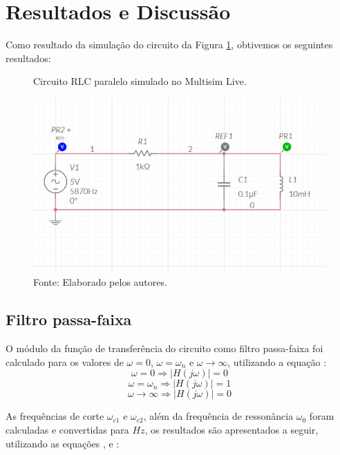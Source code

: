 \newpage
\section{Resultados e Discussão}

Como resultado da simulação do circuito da Figura \ref{circuitoSimulado}, obtivemos os seguintes resultados:

\begin{figure}[H]
	\centering
	\caption{Circuito RLC paralelo simulado no Multisim Live.}
	\includegraphics[width=15cm]{images/circuitoSimulado.png}
	\caption*{Fonte: Elaborado pelos autores.}
	\label{circuitoSimulado}
\end{figure}

\subsection{Filtro passa-faixa}
O módulo da função de transferência do circuito como filtro passa-faixa foi calculado para os valores de $\omega=0$, $\omega=\omega_n$ e $\omega\rightarrow\infty$, utilizando a equação :
\begin{equation}
	\omega=0 \Rightarrow  |H(j\omega)|= 0
\end{equation}
\begin{equation}
	\omega=\omega_n \Rightarrow |H(j\omega)|= 1
\end{equation}
\begin{equation}
	\omega\rightarrow\infty \Rightarrow |H(j\omega)|= 0
\end{equation}

As frequências de corte $\omega_{c1}$ e $\omega_{c2}$, além da frequência de ressonância $\omega_0$ foram calculadas e convertidas para $Hz$, os resultados são apresentados a seguir, utilizando as equações ,  e :


